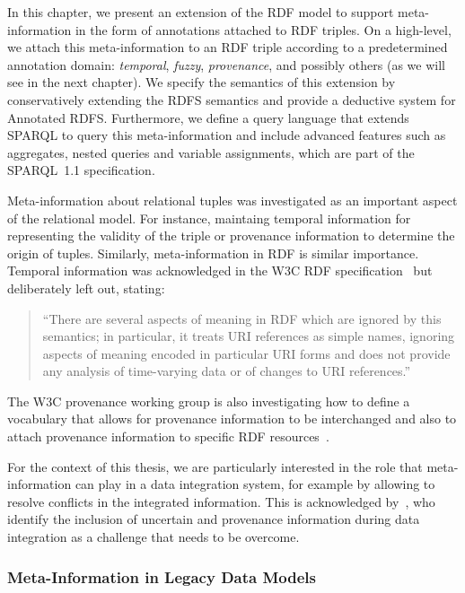 


In this chapter, we present an extension of the \ac{RDF} model to support meta-information in the form of annotations
attached to \ac{RDF} triples.  On a high-level, we attach this meta-information to an \ac{RDF} triple according to a
predetermined annotation domain: \emph{temporal}, \emph{fuzzy}, \emph{provenance}, and possibly others (as we will see
in the next chapter).
%
We specify the semantics of this extension by conservatively extending the \ac{RDFS} semantics and provide a deductive
system for Annotated RDFS.
%
Furthermore, we define a query language that extends SPARQL to query this meta-information and include advanced features
such as aggregates, nested queries and variable assignments, which are part of the SPARQL~1.1 specification.

Meta-information about relational tuples was investigated as an important aspect of the relational model.
%
For instance, maintaing temporal information for representing the validity of the triple or provenance information to
determine the origin of tuples.
%
Similarly, meta-information in \ac{RDF} is similar importance.  Temporal information was acknowledged in the \ac{W3C}
\ac{RDF} specification~\cite{Hayes:2004aa} but deliberately left out, stating:
%
\begin{quote}
  ``There are several aspects of meaning in RDF which are ignored by this semantics; in particular, it treats URI
  references as simple names, ignoring aspects of meaning encoded in particular URI forms and does not provide any
  analysis of time-varying data or of changes to URI references.''
\end{quote}
%
The \ac{W3C} provenance working group is also investigating how to define a vocabulary that allows for provenance
information to be interchanged and also to attach provenance information to specific \ac{RDF}
resources~\cite{BelhajjameDeusGarijo:2012aa}.



For the context of this thesis, we are particularly interested in the role that meta-information can play in a data
integration system, for example by allowing to resolve conflicts in the integrated information.  This is acknowledged
by~\citet{HalevyRajaramanOrdille:2006aa}, who identify the inclusion of uncertain and provenance information during data
integration as a challenge that needs to be overcome.



\subsubsection*{Meta-Information in Legacy Data Models}

